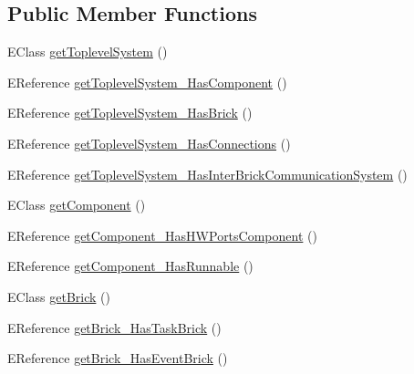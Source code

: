 \subsection*{Public Member Functions}
\begin{DoxyCompactItemize}
\item 
E\-Class \hyperlink{interfaceshootingmachineemfmodel_1_1_shootingmachineemfmodel_package_add13fbe58b8863528f84edda8e0f6559}{get\-Toplevel\-System} ()
\item 
E\-Reference \hyperlink{interfaceshootingmachineemfmodel_1_1_shootingmachineemfmodel_package_a76ef6161e5c72c2aa2d54546d39b40d7}{get\-Toplevel\-System\-\_\-\-Has\-Component} ()
\item 
E\-Reference \hyperlink{interfaceshootingmachineemfmodel_1_1_shootingmachineemfmodel_package_a534a614b57a4680c5430e042352fbb53}{get\-Toplevel\-System\-\_\-\-Has\-Brick} ()
\item 
E\-Reference \hyperlink{interfaceshootingmachineemfmodel_1_1_shootingmachineemfmodel_package_a52df154cb50e154f7a7249dd98df0641}{get\-Toplevel\-System\-\_\-\-Has\-Connections} ()
\item 
E\-Reference \hyperlink{interfaceshootingmachineemfmodel_1_1_shootingmachineemfmodel_package_a61fda3225559a8cbbb0583e15425eba1}{get\-Toplevel\-System\-\_\-\-Has\-Inter\-Brick\-Communication\-System} ()
\item 
E\-Class \hyperlink{interfaceshootingmachineemfmodel_1_1_shootingmachineemfmodel_package_a6d4775830611ba638cc97c20d99b2a5a}{get\-Component} ()
\item 
E\-Reference \hyperlink{interfaceshootingmachineemfmodel_1_1_shootingmachineemfmodel_package_affe1129e16800d7a340d1c20d7bf5091}{get\-Component\-\_\-\-Has\-H\-W\-Ports\-Component} ()
\item 
E\-Reference \hyperlink{interfaceshootingmachineemfmodel_1_1_shootingmachineemfmodel_package_a05801a7b783c78d0501c7a93e7c373b3}{get\-Component\-\_\-\-Has\-Runnable} ()
\item 
E\-Class \hyperlink{interfaceshootingmachineemfmodel_1_1_shootingmachineemfmodel_package_ac5d345f331ff0ccd58f979c044bfc51e}{get\-Brick} ()
\item 
E\-Reference \hyperlink{interfaceshootingmachineemfmodel_1_1_shootingmachineemfmodel_package_a7f5980e9b2a58022d285b476b3aab982}{get\-Brick\-\_\-\-Has\-Task\-Brick} ()
\item 
E\-Reference \hyperlink{interfaceshootingmachineemfmodel_1_1_shootingmachineemfmodel_package_ae3f0a3398912999226045e5ee0e06614}{get\-Brick\-\_\-\-Has\-Event\-Brick} ()

\end{DoxyCompactItemize}
